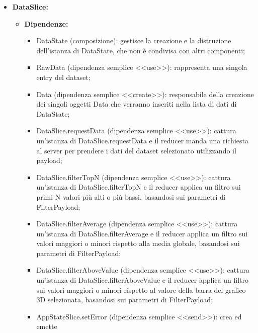 \begin{itemize}
    \item \textbf{DataSlice:}
          \begin{itemize}
              \item \textbf{Dipendenze:}
                    \begin{itemize}
                        \item DataState (composizione): gestisce la creazione e la distruzione dell'istanza
                              di DataState, che non è condivisa con altri componenti;
                        \item RawData (dipendenza semplice <<use>>): rappresenta una singola entry del
                              dataset;
                        \item Data (dipendenza semplice <<create>>): responsabile della creazione dei singoli
                              oggetti Data che verranno inseriti nella lista di dati di DataState;
                        \item DataSlice.requestData (dipendenza semplice <<use>>): cattura un'istanza di
                              DataSlice.requestData e il reducer manda una richiesta al server per prendere i
                              dati del dataset selezionato utilizzando il payload;
                        \item DataSlice.filterTopN (dipendenza semplice <<use>>): cattura un'istanza di
                              DataSlice.filterTopN e il reducer applica un filtro sui primi N valori più alti
                              o più bassi, basandosi sui parametri di FilterPayload;
                        \item DataSlice.filterAverage (dipendenza semplice <<use>>): cattura un'istanza di
                              DataSlice.filterAverage e il reducer applica un filtro sui valori maggiori o
                              minori rispetto alla media globale, basandosi sui parametri di FilterPayload;
                        \item DataSlice.filterAboveValue (dipendenza semplice <<use>>): cattura un'istanza di
                              DataSlice.filterAboveValue e il reducer applica un filtro sui valori maggiori o
                              minori rispetto al valore della barra del grafico 3D selezionata, basandosi sui
                              parametri di FilterPayload;
                        \item AppStateSlice.setError (dipendenza semplice <<send>>): crea ed emette

\end{itemize}
\end{itemize}
\end{itemize}
